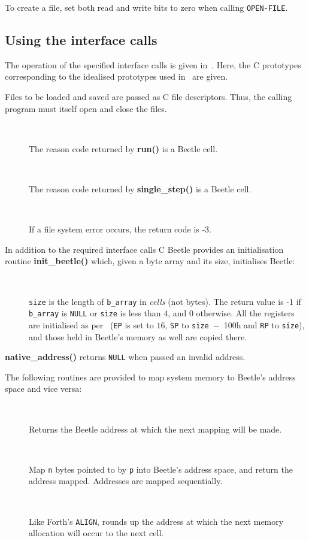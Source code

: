 \documentclass[english]{article}
\newlength{\ifacewidth}\ifacewidth=\textwidth \advance\ifacewidth by -0.1in
\newlength{\innerwidth}\innerwidth=\ifacewidth \advance\innerwidth by -0.5in
\newcommand{\ifacec}[2]{\item[]\parbox{\ifacewidth}{\hspace*{2.5mm}{\tt #1}\\[0.5ex]\hspace*{0.4in}\parbox{\innerwidth}{#2}}}
\begin{document}
To create a file, set both read and write bits to zero when calling {\tt OPEN-FILE}.


\subsection{Using the interface calls}
\label{usingcalls}

The operation of the specified interface calls is given in~\cite{beetle}. Here, the C prototypes corresponding to the idealised prototypes used in~\cite{beetle} are given.

Files to be loaded and saved are passed as C file descriptors. Thus, the
calling program must itself open and close the files.

\begin{description}
\ifacec{CELL run()}{The reason code returned by {\bf run()} is a Beetle
cell.}
\ifacec{CELL single\_step()}{The reason code returned by {\bf single\_step()}
is a Beetle cell.}
\ifacec{int load\_object(FILE *file, UCELL address)}{If a file system error
occurs, the return code is -3.}
\end{description}

In addition to the required interface calls C Beetle provides an initialisation routine {\bf init\_beetle()} which, given a byte array and its size, initialises Beetle:

\begin{description}
\ifacec{int init\_beetle(CELL *b\_array, long size)}{{\tt size} is
the length of {\tt b\_array} in {\em cells} (not bytes). The return value is -1 if {\tt b\_array} is
{\tt NULL} or {\tt size} is less than $4$, and 0 otherwise.
All the registers are initialised as per~\cite{beetle} ({\tt EP} is set to $16$, {\tt SP} to {\tt size}~$-$~100h and
{\tt RP} to {\tt size}), and those held in Beetle's memory as well are copied there.}
\end{description}

{\bf native\_address()} returns {\tt NULL} when passed an invalid address.

The following routines are provided to map system memory to Beetle’s address space and vice versa:

\begin{description}
\ifacec{UCELL mem\_here()}{Returns the Beetle address at which the next mapping will be made.}
\ifacec{UCELL mem\_allot(void *p, size\_t n)}{Map {\tt n} bytes pointed to by {\tt p} into Beetle’s address space, and return the address mapped. Addresses are mapped sequentially.}
\ifacec{UCELL mem\_align(void)}{Like Forth’s {\tt ALIGN}, rounds up the address at which the next memory allocation will occur to the next cell.}
\end{description}
\end{document}
